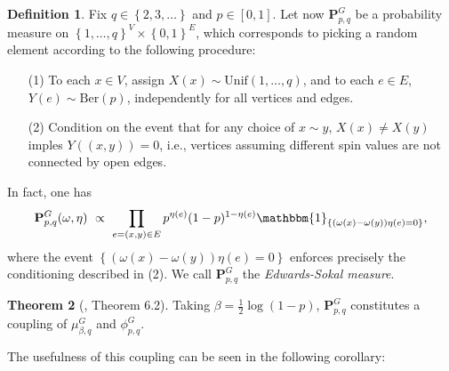 \documentclass[12pt]{article}
\newcommand{\PP}{\mathbf{P}}
\newcommand{\set}[1]{\left\{#1\right\}}
\newcommand{\1}{\mathbbm{1}}
\newcommand{\5}{\vspace{0.5cm}}
\theoremstyle{definition}
\newtheorem{thm}{Theorem}[section]
\newtheorem{df}[thm]{Definition}
\begin{document}
\begin{df}\label{def:EdwardsSokal}
Fix $q\in\set{2,3,\ldots}$ and $p\in[0,1]$. Let now $\PP_{p,q}^G$ be a probability measure on $\set{1,\ldots,q}^V\times\set{0,1}^E$, which corresponds to picking a random element according to the following procedure:
\begin{itemize}
	\item[(1)] To each $x\in V$, assign $X(x)\sim\mathrm{Unif}(1,\ldots,q)$, and to each $e\in E$, $Y(e)\sim\mathrm{Ber}(p)$, independently for all vertices and edges.
	\item[(2)] Condition on the event that for any choice of $x\sim y$, $X(x)\neq X(y)$ imples $Y((x,y))=0$, i.e., vertices assuming different spin values are not connected by open edges.
\end{itemize}
In fact, one has
$$\PP_{p,q}^G(\omega,\eta) ~\propto~ \prod_{e=(x,y)\in E}p^{\eta(e)}(1-p)^{1-\eta(e)}\1_{\set{(\omega(x)-\omega(y))\eta(e)=0}},$$
where the event $\set{(\omega(x)-\omega(y))\eta(e)=0}$ enforces precisely the conditioning described in (2). We call $\PP_{p,q}^G$ the \textit{Edwards-Sokal measure}.
\end{df}

\begin{thm}[\cite{GHM}, Theorem 6.2]
Taking $\beta=\frac{1}{2}\log(1-p)$, $\PP_{p,q}^G$ constitutes a coupling of $\mu_{\beta,q}^G$ and $\phi_{p,q}^G$.	
\end{thm}

The usefulness of this coupling can be seen in the following corollary:
\end{document}
